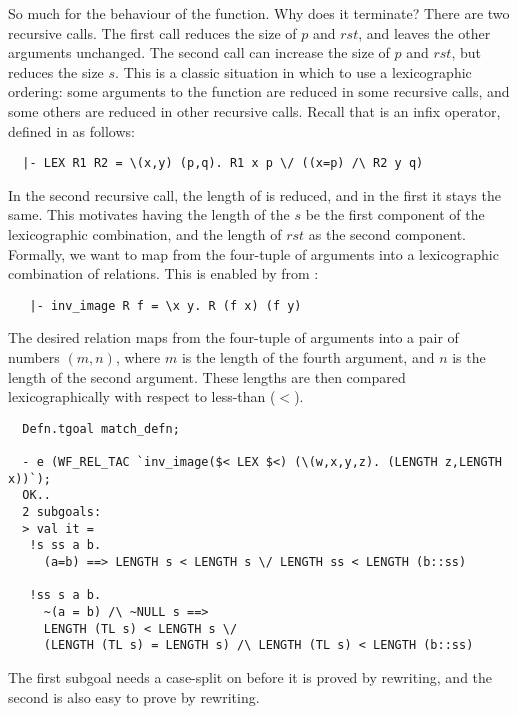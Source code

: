 So much for the behaviour of the function. Why does it terminate? There
are two recursive calls. The first call reduces the size of $p$ and $\mathit{rst}$, and 
leaves the other arguments unchanged. The second call can increase the 
size of $p$ and $\mathit{rst}$, but reduces the size $s$. This is a classic situation 
in which to use a  lexicographic ordering: some arguments to the function are reduced in 
some recursive calls, and some others are reduced in other recursive calls.  
Recall that  is an infix operator, defined in  as follows:
%
\begin{hol}
\begin{verbatim}
  |- LEX R1 R2 = \(x,y) (p,q). R1 x p \/ ((x=p) /\ R2 y q)
\end{verbatim}
\end{hol}
%
In the second recursive call, the length of  is reduced, and in
the first it stays the same. This motivates having the length of the
$s$ be the first component of the lexicographic
combination, and the length of $\mathit{rst}$ as the second
component. Formally, we want to map from the four-tuple of 
arguments into a lexicographic combination of relations. 
This is enabled by  from :
%
\begin{hol}
\begin{verbatim}
   |- inv_image R f = \x y. R (f x) (f y)
\end{verbatim}
\end{hol}
%
The desired relation maps from the four-tuple of arguments into a pair
of numbers $(m,n)$, where $m$ is the length of the fourth argument, and
$n$ is the length of the second argument. These lengths are then
compared lexicographically with respect to less-than ($<$).
\begin{session}
\begin{hol}
\begin{verbatim}
  Defn.tgoal match_defn;

  - e (WF_REL_TAC `inv_image($< LEX $<) (\(w,x,y,z). (LENGTH z,LENGTH x))`);
  OK..
  2 subgoals:
  > val it =
   !s ss a b.
     (a=b) ==> LENGTH s < LENGTH s \/ LENGTH ss < LENGTH (b::ss)

   !ss s a b.
     ~(a = b) /\ ~NULL s ==>
     LENGTH (TL s) < LENGTH s \/
     (LENGTH (TL s) = LENGTH s) /\ LENGTH (TL s) < LENGTH (b::ss)
\end{verbatim}
\end{hol}
\end{session}
%
The first subgoal needs a case-split on  before it is proved by
rewriting, and the second is also easy to prove by rewriting.

